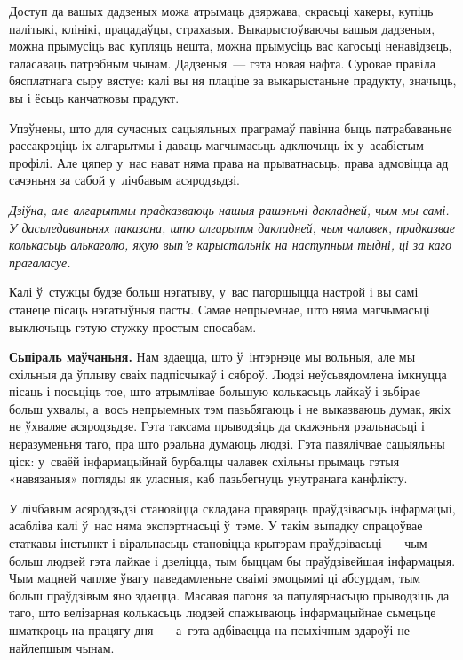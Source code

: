 Доступ да вашых дадзеных можа атрымаць дзяржава, скрасьці хакеры, купіць палітыкі, клінікі, працадаўцы, страхавыя. Выкарыстоўваючы вашыя дадзеныя, можна прымусіць вас купляць нешта, можна прымусіць вас кагосьці ненавідзець, галасаваць патрэбным чынам. Дадзеныя~--- гэта новая нафта. Суровае правіла бясплатнага сыру вястуе: калі вы ня плаціце за выкарыстаньне прадукту, значыць, вы і ёсьць канчатковы прадукт.


Упэўнены, што для сучасных сацыяльных праграмаў павінна быць патрабаваньне рассакрэціць іх алгарытмы і даваць магчымасьць адключыць іх у~асабістым профілі. Але цяпер у~нас нават няма права на прыватнасьць, права адмовіцца ад сачэньня за сабой у~лічбавым асяродзьдзі.

\emph{Дзіўна, але алгарытмы прадказваюць нашыя рашэньні дакладней, чым мы самі. У дасьледаваньнях паказана, што алгарытм дакладней, чым чалавек, прадказвае колькасьць алькаголю, якую вып'е карыстальнік на наступным тыдні, ці за каго прагаласуе.} 

Калі ў~стужцы будзе больш нэгатыву, у~вас пагоршыцца настрой і вы самі станеце пісаць нэгатыўныя пасты. Самае непрыемнае, што няма магчымасьці выключыць гэтую стужку простым спосабам.

\textbf{Сьпіраль маўчаньня.} Нам здаецца, што ў~інтэрнэце мы вольныя, але мы схільныя да ўплыву сваіх падпісчыкаў і сяброў. Людзі неўсьвядомлена імкнуцца пісаць і посьціць тое, што атрымлівае большую колькасьць лайкаў і зьбірае больш ухвалы, а~вось непрыемных тэм пазьбягаюць і не выказваюць думак, якіх не ўхваляе асяродзьдзе. Гэта таксама прыводзіць да скажэньня рэальнасьці і неразуменьня таго, пра што рэальна думаюць людзі. Гэта павялічвае сацыяльны ціск: у~сваёй інфармацыйнай бурбалцы чалавек схільны прымаць гэтыя «навязаныя» погляды як уласныя, каб пазьбегнуць унутранага канфлікту.

У лічбавым асяродзьдзі становіцца складана правяраць праўдзівасьць інфармацыі, асабліва калі ў~нас няма экспэртнасьці ў~тэме. У такім выпадку спрацоўвае статкавы інстынкт і віральнасьць становіцца крытэрам праўдзівасьці~--- чым больш людзей гэта лайкае і дзеліцца, тым быццам бы праўдзівейшая інфармацыя. Чым мацней чапляе ўвагу паведамленьне сваімі эмоцыямі ці абсурдам, тым больш праўдзівым яно здаецца. Масавая пагоня за папулярнасьцю прыводзіць да таго, што велізарная колькасьць людзей спажываюць інфармацыйнае сьмецьце шматкроць на працягу дня~--- а~гэта адбіваецца на псыхічным здароўі не найлепшым чынам.

